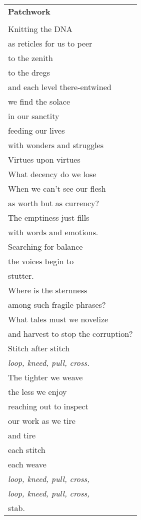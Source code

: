 \documentclass{article}
\begin{document}
\begin{center}
\begin{tabular}{l}
\textbf{Patchwork} \\
\\
Knitting the DNA \\
as reticles for us to peer \\
to the zenith \\
to the dregs \\
and each level there-entwined \\
we find the solace \\
in our sanctity \\
feeding our lives \\
with wonders and struggles \\
Virtues upon virtues \\
What decency do we lose \\
When we can't see our flesh \\
as worth but as currency? \\
The emptiness just fills \\
with words and emotions. \\
Searching for balance \\
the voices begin to \\
stutter. \\
Where is the sternness \\
among such fragile phrases? \\
What tales must we novelize \\
and harvest to stop the corruption? \\
Stitch after stitch \\
\textit{loop, kneed, pull, cross.} \\
The tighter we weave \\
the less we enjoy \\
reaching out to inspect \\
our work as we tire \\
and tire \\
each stitch \\
each weave \\
\textit{loop, kneed, pull, cross,} \\
\textit{loop, kneed, pull, cross,} \\
stab. \\
\end{tabular}
\end{center}
\end{document}
